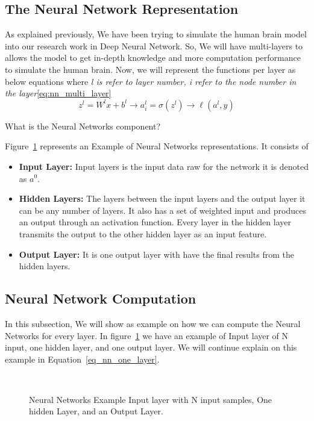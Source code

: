 \subsection{The Neural Network Representation}
 As explained previously, We have been trying to simulate the human brain model into our research work in Deep Neural Network. So, We will have multi-layers to allows the model to get in-depth knowledge and more computation performance to simulate the human brain.
 Now, we will represent the functions per layer as below equations where \textit{l is refer to layer number, i refer to the node number in the layer}\eqref{eq:nn_multi_layer}%
 \begin{equation}\label{eq:nn_multi_layer}
  \boxed{z^l =  W^l x + b^l} \longrightarrow \boxed{a_i^l =  \sigma(z^l)} \longrightarrow \boxed{\ell(a^l,y)}
\end{equation}

What is the Neural Networks component?

Figure~\ref{Fig:NNExample} represents an Example of Neural Networks representations. It consists of

\begin{itemize}
\item \textbf{Input Layer:} Input layers is the input data raw for the network it is denoted as $a^0$.
\item \textbf{Hidden Layers:} The layers between the input layers and the output layer it can be any number of layers. It also has a set of weighted input and produces an output through an activation function. Every layer in the hidden layer transmits the output to the other hidden layer as an input feature.
\item \textbf{Output Layer:} It is one output layer with have the final results from the hidden layers.
\end{itemize}
 \subsection{Neural Network Computation}
 In this subsection, We will show as example on how we can compute the Neural Networks for every layer. In figure~\ref{Fig:NNExample} we have an example of Input layer of N input, one hidden layer, and one output layer. We will continue explain on this example in Equation~\eqref{eq_nn_one_layer}.%

 \begin{figure}[!t]
   
  \caption{Neural Networks Example Input layer with N input samples, One hidden Layer, and an Output Layer.}~\label{Fig:NNExample}
\end{figure}%

